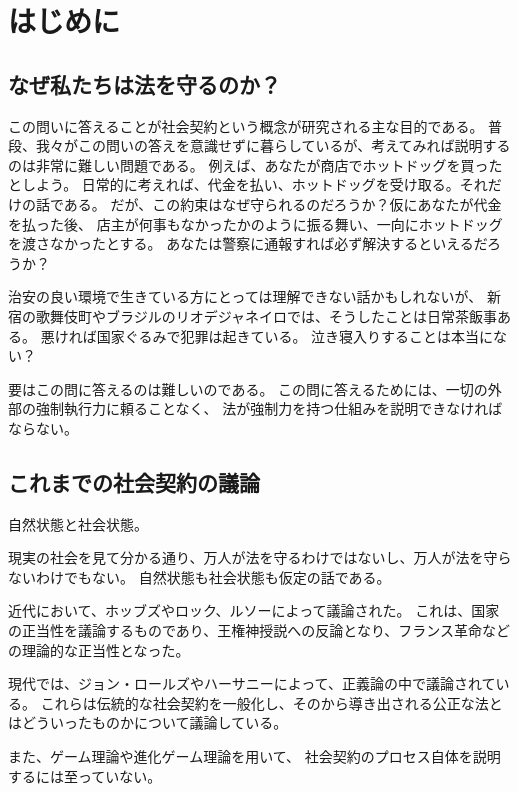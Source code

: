 
\chapter{はじめに}

  \section{なぜ私たちは法を守るのか？} %
  この問いに答えることが社会契約という概念が研究される主な目的である。
  普段、我々がこの問いの答えを意識せずに暮らしているが、考えてみれば説明するのは非常に難しい問題である。
  例えば、あなたが商店でホットドッグを買ったとしよう。
  日常的に考えれば、代金を払い、ホットドッグを受け取る。それだけの話である。
  だが、この約束はなぜ守られるのだろうか？仮にあなたが代金を払った後、
  店主が何事もなかったかのように振る舞い、一向にホットドッグを渡さなかったとする。
  あなたは警察に通報すれば必ず解決するといえるだろうか？
  
  治安の良い環境で生きている方にとっては理解できない話かもしれないが、
  新宿の歌舞伎町やブラジルのリオデジャネイロでは、そうしたことは日常茶飯事ある。
  悪ければ国家ぐるみで犯罪は起きている。
  泣き寝入りすることは本当にない？

  要はこの問に答えるのは難しいのである。
  この問に答えるためには、一切の外部の強制執行力に頼ることなく、
  法が強制力を持つ仕組みを説明できなければならない。

  \section{これまでの社会契約の議論} %
  自然状態と社会状態。


  現実の社会を見て分かる通り、万人が法を守るわけではないし、万人が法を守らないわけでもない。
  自然状態も社会状態も仮定の話である。

  近代において、ホッブズやロック、ルソーによって議論された。
  これは、国家の正当性を議論するものであり、王権神授説への反論となり、フランス革命などの理論的な正当性となった。

  現代では、ジョン・ロールズやハーサニーによって、正義論の中で議論されている。
  これらは伝統的な社会契約を一般化し、そのから導き出される公正な法とはどういったものかについて議論している。

  また、ゲーム理論や進化ゲーム理論を用いて、
  社会契約のプロセス自体を説明するには至っていない。


